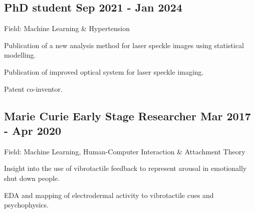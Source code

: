 \documentclass[a4paper,12pt]{article}
\begin{document}

\subsection{PhD student \hfill Sep 2021 - Jan 2024}
\vspace*{1pt}
Field: Machine Learning \& Hypertension \\
\vspace*{\spaceAfterField}
\begin{zitemize}
\item Publication of a new analysis method for laser speckle images using statistical modelling. 
\item Publication of improved optical system for laser speckle imaging.
\item Patent co-inventor.
\end{zitemize}
\vspace*{5pt}


\subsection{Marie Curie Early Stage Researcher \hfill Mar 2017 - Apr 2020}
\vspace*{1pt}
Field: Machine Learning, Human-Computer Interaction \& Attachment Theory
\vspace*{\spaceAfterField}
\begin{zitemize}
    \item Insight into the use of vibrotactile feedback to represent arousal in emotionally shut down people.
    \item EDA and mapping of electrodermal activity to vibrotactile cues and psychophysics.

\end{zitemize}
\vspace*{5pt}

\end{document}
